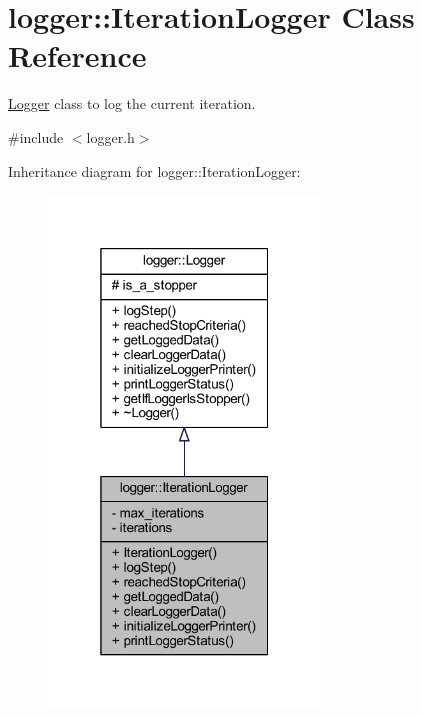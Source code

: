 \hypertarget{classlogger_1_1_iteration_logger}{}\section{logger\+:\+:Iteration\+Logger Class Reference}
\label{classlogger_1_1_iteration_logger}


\mbox{\hyperlink{classlogger_1_1_logger}{Logger}} class to log the current iteration.  




{\ttfamily \#include $<$logger.\+h$>$}



Inheritance diagram for logger\+:\+:Iteration\+Logger\+:\nopagebreak
\begin{figure}[H]
\begin{center}
\leavevmode
\includegraphics[width=205pt]{classlogger_1_1_iteration_logger__inherit__graph}
\end{center}
\end{figure}


